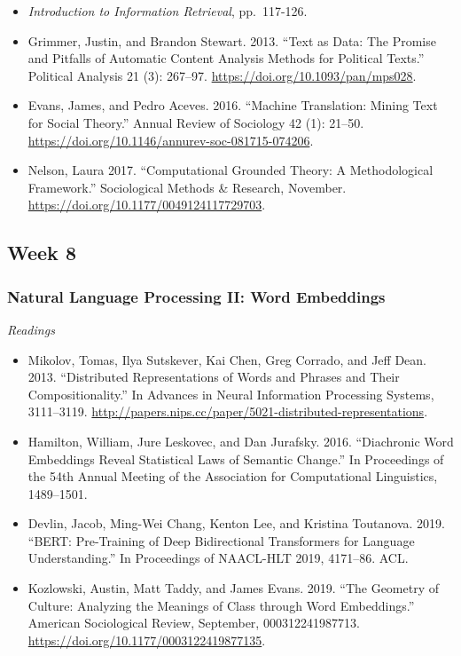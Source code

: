 \documentclass[
  10pt,
]{article}
\providecommand{\tightlist}{%
  \setlength{\itemsep}{0pt}\setlength{\parskip}{0pt}}
\begin{document}
\begin{itemize}
\tightlist
\item
  \emph{Introduction to Information Retrieval}, pp.~117-126.
\item
  Grimmer, Justin, and Brandon Stewart. 2013. ``Text as Data: The
  Promise and Pitfalls of Automatic Content Analysis Methods for
  Political Texts.'' Political Analysis 21 (3): 267--97.
  \url{https://doi.org/10.1093/pan/mps028}.
\item
  Evans, James, and Pedro Aceves. 2016. ``Machine Translation: Mining
  Text for Social Theory.'' Annual Review of Sociology 42 (1): 21--50.
  \url{https://doi.org/10.1146/annurev-soc-081715-074206}.
\item
  Nelson, Laura 2017. ``Computational Grounded Theory: A Methodological
  Framework.'' Sociological Methods \& Research, November.
  \url{https://doi.org/10.1177/0049124117729703}.
\end{itemize}

\hypertarget{week-8}{%
\subsection{Week 8}\label{week-8}}

\hypertarget{natural-language-processing-ii-word-embeddings}{%
\subsubsection{Natural Language Processing II: Word
Embeddings}\label{natural-language-processing-ii-word-embeddings}}

\emph{Readings}

\begin{itemize}
\tightlist
\item
  Mikolov, Tomas, Ilya Sutskever, Kai Chen, Greg Corrado, and Jeff Dean.
  2013. ``Distributed Representations of Words and Phrases and Their
  Compositionality.'' In Advances in Neural Information Processing
  Systems, 3111--3119.
  \url{http://papers.nips.cc/paper/5021-distributed-representations}.
\item
  Hamilton, William, Jure Leskovec, and Dan Jurafsky. 2016. ``Diachronic
  Word Embeddings Reveal Statistical Laws of Semantic Change.'' In
  Proceedings of the 54th Annual Meeting of the Association for
  Computational Linguistics, 1489--1501.
\item
  Devlin, Jacob, Ming-Wei Chang, Kenton Lee, and Kristina Toutanova.
  2019. ``BERT: Pre-Training of Deep Bidirectional Transformers for
  Language Understanding.'' In Proceedings of NAACL-HLT 2019, 4171--86.
  ACL.
\item
  Kozlowski, Austin, Matt Taddy, and James Evans. 2019. ``The Geometry
  of Culture: Analyzing the Meanings of Class through Word Embeddings.''
  American Sociological Review, September, 000312241987713.
  \url{https://doi.org/10.1177/0003122419877135}.
\end{itemize}
\end{document}
